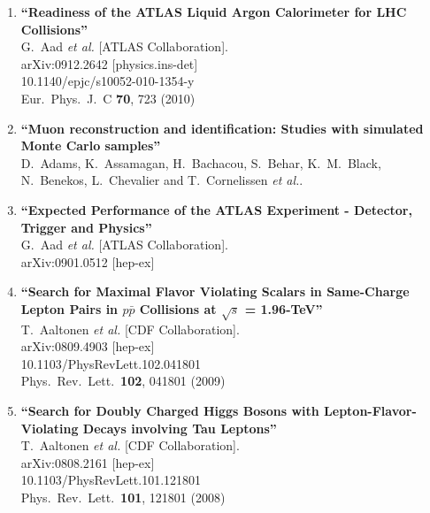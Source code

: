 \documentclass{article}
\begin{document}
\begin{enumerate}
\item%
{\bf ``Readiness of the ATLAS Liquid Argon Calorimeter for LHC Collisions''}
  \\{}G.~Aad {\it et al.}  [ATLAS Collaboration].
  \\{}arXiv:0912.2642 [physics.ins-det]
    \\{}10.1140/epjc/s10052-010-1354-y
\\{}Eur.\ Phys.\ J.\ C {\bf 70}, 723 (2010) %


\item%
{\bf ``Muon reconstruction and identification: Studies with simulated Monte Carlo samples''}
  \\{}D.~Adams, K.~Assamagan, H.~Bachacou, S.~Behar, K.~M.~Black, N.~Benekos, L.~Chevalier and T.~Cornelissen {\it et al.}.
  


\item%
{\bf ``Expected Performance of the ATLAS Experiment - Detector, Trigger and Physics''}
  \\{}G.~Aad {\it et al.}  [ATLAS Collaboration].
  \\{}arXiv:0901.0512 [hep-ex]
  


\item%
{\bf ``Search for Maximal Flavor Violating Scalars in Same-Charge Lepton Pairs in $p \bar{p}$ Collisions at $\sqrt{s}$ = 1.96-TeV''}
  \\{}T.~Aaltonen {\it et al.}  [CDF Collaboration].
  \\{}arXiv:0809.4903 [hep-ex]
    \\{}10.1103/PhysRevLett.102.041801
\\{}Phys.\ Rev.\ Lett.\  {\bf 102}, 041801 (2009) %


\item%
{\bf ``Search for Doubly Charged Higgs Bosons with Lepton-Flavor-Violating Decays involving Tau Leptons''}
  \\{}T.~Aaltonen {\it et al.}  [CDF Collaboration].
  \\{}arXiv:0808.2161 [hep-ex]
    \\{}10.1103/PhysRevLett.101.121801
\\{}Phys.\ Rev.\ Lett.\  {\bf 101}, 121801 (2008) %



\end{enumerate}
\end{document}
